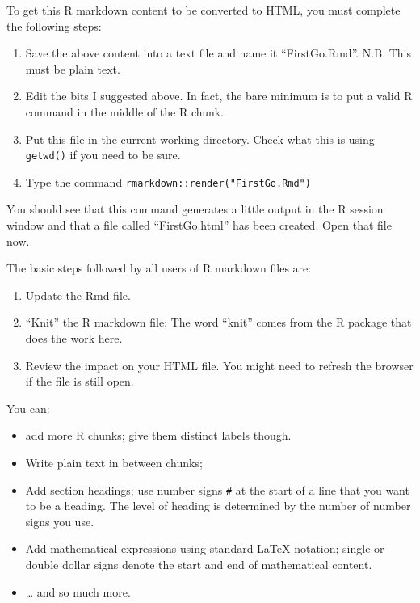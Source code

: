 \documentclass[
]{book}
\providecommand{\tightlist}{%
  \setlength{\itemsep}{0pt}\setlength{\parskip}{0pt}}
\begin{document}
To get this R markdown content to be converted to HTML, you must complete the following steps:

\begin{enumerate}
\def\labelenumi{\arabic{enumi}.}
\tightlist
\item
  Save the above content into a text file and name it ``FirstGo.Rmd''. N.B. This must be plain text.
\item
  Edit the bits I suggested above. In fact, the bare minimum is to put a valid R command in the middle of the R chunk.
\item
  Put this file in the current working directory. Check what this is using \texttt{getwd()} if you need to be sure.
\item
  Type the command \texttt{rmarkdown::render("FirstGo.Rmd")}
\end{enumerate}

You should see that this command generates a little output in the R session window and that a file called ``FirstGo.html'' has been created. Open that file now.

The basic steps followed by all users of R markdown files are:

\begin{enumerate}
\def\labelenumi{\arabic{enumi}.}
\tightlist
\item
  Update the Rmd file.
\item
  ``Knit'' the R markdown file; The word ``knit'' comes from the R package that does the work here.
\item
  Review the impact on your HTML file. You might need to refresh the browser if the file is still open.
\end{enumerate}

You can:

\begin{itemize}
\tightlist
\item
  add more R chunks; give them distinct labels though.
\item
  Write plain text in between chunks;
\item
  Add section headings; use number signs \texttt{\#} at the start of a line that you want to be a heading. The level of heading is determined by the number of number signs you use.
\item
  Add mathematical expressions using standard LaTeX notation; single or double dollar signs denote the start and end of mathematical content.
\item
  \ldots{} and so much more.
\end{itemize}
\end{document}
